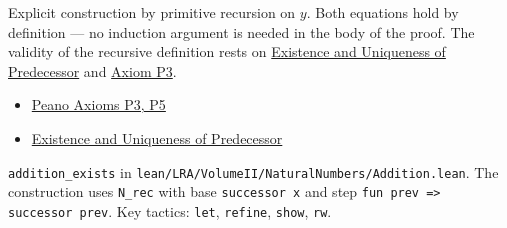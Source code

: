 \begin{remark*}
Explicit construction by primitive recursion on $y$. Both equations hold by
definition --- no induction argument is needed in the body of the proof.
The validity of the recursive definition rests on
\hyperref[thm:landau-pred-unique]{Existence and Uniqueness of Predecessor}
and \hyperref[ax:landau-peano]{Axiom P3}.

\end{remark*}

\begin{dependencies}
\begin{itemize}
  \item \hyperref[ax:landau-peano]{Peano Axioms P3, P5}
  \item \hyperref[thm:landau-pred-unique]{Existence and Uniqueness of Predecessor}
\end{itemize}

\end{dependencies}

\begin{remark*}
\texttt{addition\_exists} in
\texttt{lean/LRA/VolumeII/NaturalNumbers/Addition.lean}.
The construction uses \texttt{N\_rec} with base \texttt{successor x}
and step \texttt{fun prev => successor prev}.
Key tactics: \texttt{let}, \texttt{refine}, \texttt{show}, \texttt{rw}.
\end{remark*}

\clearpage
